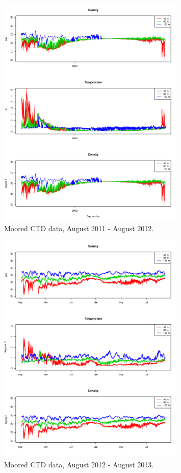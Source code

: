 \documentclass[12pt]{dforeport}
\begin{document}
\begin{figure}
\centering
\includegraphics[width = 0.8\textwidth]{./figures/05_mctd_2011_2012.png}
\caption[Moored CTD, August 2011-2012]{Moored CTD data, August 2011 - August 2012.}
\label{f:mctd_2011_2012}
\end{figure}

\begin{figure}
\centering
\includegraphics[width = 0.8\textwidth]{./figures/06_mctd_2012_2013.png}
\caption[Moored CTD, August 2012-2013]{Moored CTD data, August 2012 - August 2013.}
\label{f:mctd_2012_2013}
\end{figure}
\end{document}
